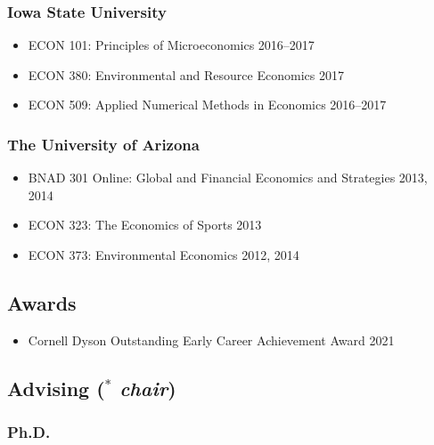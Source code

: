 \documentclass[12pt]{res} %
\begin{document}
\begin{resume}
\subsubsection{Iowa State University}
\begin{itemize} \itemsep -1pt
	\item[] ECON 101: Principles of Microeconomics \hfill 2016--2017
	\item[] ECON 380: Environmental and Resource Economics \hfill 2017
	\item[] ECON 509: Applied Numerical Methods in Economics \hfill 2016--2017
\end{itemize}\vspace{-.4in}
\subsubsection{The University of Arizona}
\begin{itemize} \itemsep -1pt %
	\item[] BNAD 301 Online: Global and Financial Economics and Strategies \hfill 2013, 2014
	\item[] ECON 323: The Economics of Sports \hfill 2013
	\item[] ECON 373: Environmental Economics \hfill 2012, 2014
\end{itemize}

\vspace{-.2in}

\subsection{Awards}
\begin{itemize}
	\item[] Cornell Dyson Outstanding Early Career Achievement Award \hfill 2021
\end{itemize}

\vspace{-.2in}

\subsection{Advising ($^*$ \textit{chair})  }
\vspace{-.2in}

\subsubsection{Ph.D.}\vspace{-.2in}

\end{resume}
\end{document}

